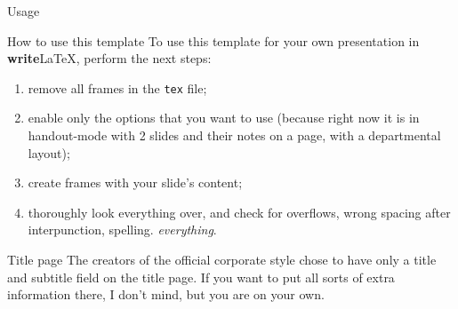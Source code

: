 \documentclass[showdate=true, slidenumbers=slide]{beamerruhuisstijl169}
\begin{document}
\begin{frame}{Usage}
    \begin{block}{How to use this template}
        To use this template for your own presentation in \textbf{write}\LaTeX{}, perform the next steps:
        \begin{enumerate}
            \item remove all frames in the \texttt{tex} file;
            \item enable only the options that you want to use (because right now it is in handout-mode with 2 slides and their notes on a page, with a departmental layout);
            \item create frames with your slide's content;
            \item thoroughly look everything over, and check for overflows, wrong spacing after interpunction, spelling. \emph{everything}.
        \end{enumerate}
    \end{block}

    \begin{block}{Title page}
        The creators of the official corporate style chose to have only a title and subtitle field on the title page. If you want to put all sorts of extra information there, I don't mind, but you are on your own.
    \end{block}
\end{frame}
\end{document}

